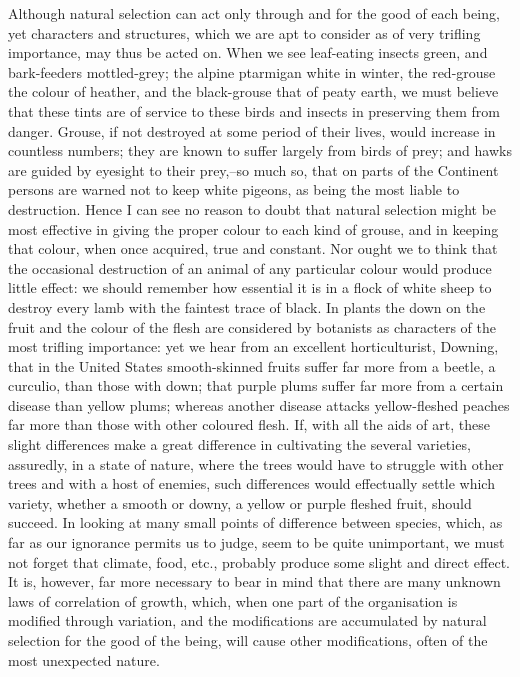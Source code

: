 Although natural selection can act only through and for the good of each being, yet characters and structures, which we are apt to consider as of very trifling importance, may thus be acted on. When we see leaf-eating insects green, and bark-feeders mottled-grey; the alpine ptarmigan white in winter, the red-grouse the colour of heather, and the black-grouse that of peaty earth, we must believe that these tints are of service to these birds and insects in preserving them from danger. Grouse, if not destroyed at some period of their lives, would increase in countless numbers; they are known to suffer largely from birds of prey; and hawks are guided by eyesight to their prey,--so much so, that on parts of the Continent persons are warned not to keep white pigeons, as being the most liable to destruction. Hence I can see no reason to doubt that natural selection might be most effective in giving the proper colour to each kind of grouse, and in keeping that colour, when once acquired, true and constant. Nor ought we to think that the occasional destruction of an animal of any particular colour would produce little effect: we should remember how essential it is in a flock of white sheep to destroy every lamb with the faintest trace of black. In plants the down on the fruit and the colour of the flesh are considered by botanists as characters of the most trifling importance: yet we hear from an excellent horticulturist, Downing, that in the United States smooth-skinned fruits suffer far more from a beetle, a curculio, than those with down; that purple plums suffer far more from a certain disease than yellow plums; whereas another disease attacks yellow-fleshed peaches far more than those with other coloured flesh. If, with all the aids of art, these slight differences make a great difference in cultivating the several varieties, assuredly, in a state of nature, where the trees would have to struggle with other trees and with a host of enemies, such differences would effectually settle which variety, whether a smooth or downy, a yellow or purple fleshed fruit, should succeed.
In looking at many small points of difference between species, which, as far as our ignorance permits us to judge, seem to be quite unimportant, we must not forget that climate, food, etc., probably produce some slight and direct effect. It is, however, far more necessary to bear in mind that there are many unknown laws of correlation of growth, which, when one part of the organisation is modified through variation, and the modifications are accumulated by natural selection for the good of the being, will cause other modifications, often of the most unexpected nature.
